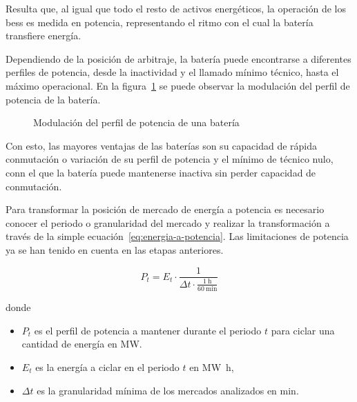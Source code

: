 Resulta que, al igual que todo el resto de activos energéticos, la operación de los \gls{bess} es medida en potencia, representando el ritmo con el cual la batería transfiere energía.

Dependiendo de la posición de arbitraje, la batería puede encontrarse a diferentes perfiles de potencia, desde la inactividad y el llamado mínimo técnico, hasta el máximo operacional. En la figura~\ref{fig:perfil-potencia} se puede observar la modulación del perfil de potencia de la batería.

\begin{figure}
  \centering
  \caption{Modulación del perfil de potencia de una batería}
  \label{fig:perfil-potencia}
\end{figure}

Con esto, las mayores ventajas de las baterías son su capacidad de rápida conmutación o variación de su perfil de potencia y el mínimo de técnico nulo, conn el que la batería puede mantenerse inactiva sin perder capacidad de conmutación.

Para transformar la posición de mercado de energía a potencia es necesario conocer el periodo o granularidad del mercado y realizar la transformación a través de la simple ecuación~\ref{eq:energia-a-potencia}. Las limitaciones de potencia ya se han tenido en cuenta en las etapas anteriores.

\begin{equation}
  \label{eq:energia-a-potencia}
  P_{t} = E_{t} \cdot \frac{1}{\Delta t \cdot \frac{\SI{1}{\hour}}{\SI{60}{\minute}}}
\end{equation}

donde

\begin{itemize}

  \item \( P_{t} \) es el perfil de potencia a mantener durante el periodo \( t \) para ciclar una cantidad de energía en \si{\mega\watt}.

  \item \( E_{t} \) es la energía a ciclar en el periodo \( t \) en \si{{\mega\watt\hour}},

  \item \( \Delta t \) es la granularidad mínima de los mercados analizados en \si{\minute}.

\end{itemize}

